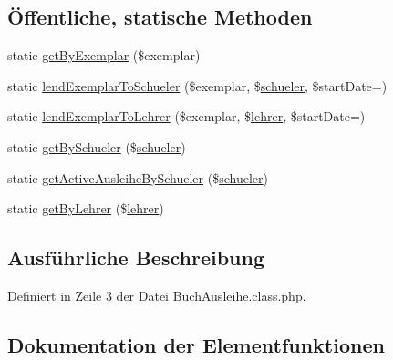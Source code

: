 \subsection*{Öffentliche, statische Methoden}
\begin{DoxyCompactItemize}
\item 
static \mbox{\hyperlink{class_buch_ausleihe_afa2d5973d51779266c1605e603cbcddd}{get\+By\+Exemplar}} (\$exemplar)
\item 
static \mbox{\hyperlink{class_buch_ausleihe_a399df7c887d9ff7e2ad53bf210c05f6d}{lend\+Exemplar\+To\+Schueler}} (\$exemplar, \$\mbox{\hyperlink{classschueler}{schueler}}, \$start\+Date=\textquotesingle{}\textquotesingle{})
\item 
static \mbox{\hyperlink{class_buch_ausleihe_a1f2dfb8eb955e252775b54fdb1e87cad}{lend\+Exemplar\+To\+Lehrer}} (\$exemplar, \$\mbox{\hyperlink{classlehrer}{lehrer}}, \$start\+Date=\textquotesingle{}\textquotesingle{})
\item 
static \mbox{\hyperlink{class_buch_ausleihe_a99d51b3d315ab0df97862b895940d441}{get\+By\+Schueler}} (\$\mbox{\hyperlink{classschueler}{schueler}})
\item 
static \mbox{\hyperlink{class_buch_ausleihe_a153d1dc43dd2b82ea68d5dbd4d144cf8}{get\+Active\+Ausleihe\+By\+Schueler}} (\$\mbox{\hyperlink{classschueler}{schueler}})
\item 
static \mbox{\hyperlink{class_buch_ausleihe_a20ab3adc95e49c0fc50d04a895c3cb97}{get\+By\+Lehrer}} (\$\mbox{\hyperlink{classlehrer}{lehrer}})
\end{DoxyCompactItemize}


\subsection{Ausführliche Beschreibung}


Definiert in Zeile 3 der Datei Buch\+Ausleihe.\+class.\+php.



\subsection{Dokumentation der Elementfunktionen}
\mbox{\label{class_buch_ausleihe_a153d1dc43dd2b82ea68d5dbd4d144cf8}} 
